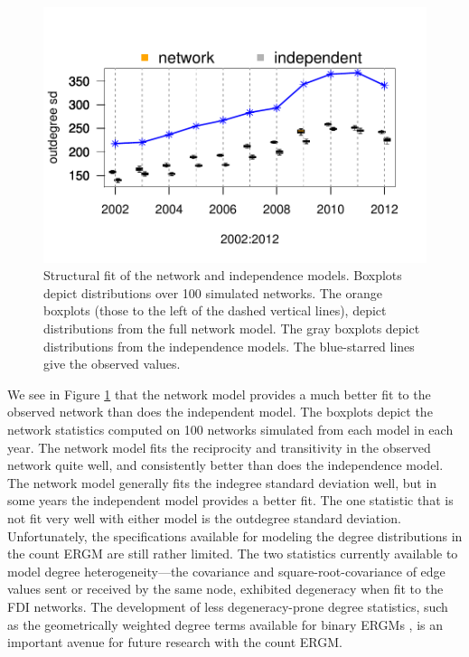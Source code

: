 \documentclass[reqno,onecolumn,letterpaper,12pt]{article}
\begin{document}
\begin{figure}[]
\includegraphics[scale=.75, trim = 0cm 1.5cm .1cm 2.4cm, clip=true]{figures/odsd_fit.pdf} \vspace{-.2cm}
\caption{\label{fig:structureFit} Structural fit of the network and independence models. Boxplots depict distributions over 100 simulated networks. The orange boxplots (those to the left of the dashed vertical lines), depict distributions from the full network model. The gray boxplots depict distributions from the independence models. The blue-starred lines give the observed values. }
\end{figure}
We see in Figure \ref{fig:structureFit} that the network model provides a much better fit to the observed network than does the independent model. The boxplots depict the network statistics computed on 100 networks simulated from each model in each year. The network model fits the reciprocity and transitivity in the observed network quite well, and consistently better than does the independence model. The network model generally fits the indegree standard deviation well, but in some years the independent model provides a better fit. The one statistic that is not fit very well with either model is the outdegree standard deviation. Unfortunately, the specifications available for modeling the degree distributions in the count ERGM are still rather limited. The two statistics currently available to model degree heterogeneity---the covariance and square-root-covariance of edge values sent or received by the same node, exhibited degeneracy when fit to the FDI networks. The development of less degeneracy-prone degree statistics, such as the geometrically weighted degree terms available for binary ERGMs \citep{snijders2006new}, is an important avenue for future research with the count ERGM.
\end{document}
